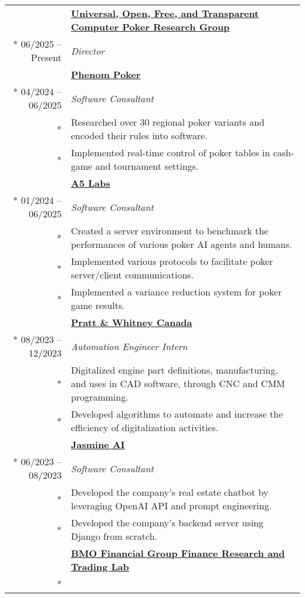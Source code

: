 \documentclass{article}
\begin{document}
	\begin{tabularx}{\textwidth}{r X}
		& \textbf{\href{https://uoftcprg.com/}{Universal, Open, Free, and Transparent Computer Poker Research Group}} \\*
		06/2025 -- Present & \textit{Director} \\
		\addlinespace
		& \textbf{\href{https://www.phenompoker.com/}{Phenom Poker}} \\*
		04/2024 -- 06/2025 & \textit{Software Consultant} \\*
		& {\small Researched over 30 regional poker variants and encoded their rules into software.} \\*
		& {\small Implemented real-time control of poker tables in cash-game and tournament settings.} \\
		\addlinespace
		& \textbf{\href{https://a5labs.co/}{A5 Labs}} \\*
		01/2024 -- 06/2025 & \textit{Software Consultant} \\*
		& {\small Created a server environment to benchmark the performances of various poker AI agents and humans.} \\*
		& {\small Implemented various protocols to facilitate poker server/client communications.} \\*
		& {\small Implemented a variance reduction system for poker game results.} \\
		\addlinespace
		& \textbf{\href{https://www.prattwhitney.com/}{Pratt \& Whitney Canada}} \\*
		08/2023 -- 12/2023 & \textit{Automation Engineer Intern} \\*
		& {\small Digitalized engine part definitions, manufacturing, and uses in CAD software, through CNC and CMM programming.} \\*
		& {\small Developed algorithms to automate and increase the efficiency of digitalization activities.} \\
		\iftoggle{verbose}{
			\addlinespace
			& \textbf{\href{https://jasminechatbot.com/}{Jasmine AI}} \\*
			06/2023 -- 08/2023 & \textit{Software Consultant} \\*
			& {\small Developed the company's real estate chatbot by leveraging OpenAI API and prompt engineering.} \\*
			& {\small Developed the company's backend server using Django from scratch.} \\
		}{}
		\addlinespace
		& \textbf{\href{https://inside.rotman.utoronto.ca/financelab/}{BMO Financial Group Finance Research and Trading Lab}} \\*

\end{tabularx}
\end{document}
